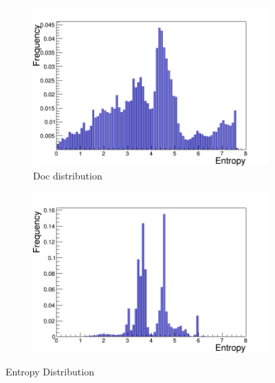 \begin{figure}[H]
   \begin{subfigure}[b]{.5\linewidth}
    \raggedleft
     \includegraphics[scale=0.33]{./Figures/entropy/Entropy_doc}
   \caption{Doc distribution}
    \label{fig:1c}
  \end{subfigure}%
  \begin{subfigure}[b]{.5\linewidth}
    \raggedright
        \includegraphics[scale=0.33]{./Figures/entropy/Entropy_text}
    \label{fig:1d}
  \end{subfigure}
  
  
  \caption{Entropy Distribution}
  \label{fig:entropy}
  
\end{figure}